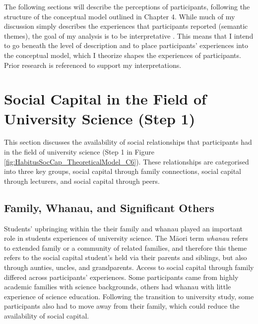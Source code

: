 The following sections will describe the perceptions of participants, following the structure of the conceptual model outlined in Chapter 4. While much of my discussion simply describes the experiences that participants reported (semantic themes), the goal of my analysis is to be interpretative \citep{Braun_2006}. This means that I intend to go beneath the level of description and to place participants' experiences into the conceptual model, which I theorize shapes the experiences of participants. Prior research is referenced to support my interpretations. 

\section{Social Capital in the Field of University Science (Step 1)}
This section discusses the availability of social relationships that participants had in the field of university science (Step 1 in Figure \ref{fig:HabitusSocCap_TheoreticalModel_C6}). These relationships are categorised into three key groups, social capital through family connections, social capital through lecturers, and social capital through peers. 

\subsection{Family, Whanau, and Significant Others}
Students' upbringing within the their family and whanau played an important role in students experiences of university science. The M\={a}ori term \textit{whanau} refers to extended family or a community of related families, and therefore this theme refers to the social capital student's held via their parents and siblings, but also through aunties, uncles, and grandparents. Access to social capital through family differed across participants' experiences. Some participants came from highly academic families with science backgrounds, others had whanau with little experience of science education. Following the transition to university study, some participants also had to move away from their family, which could reduce the availability of social capital.

